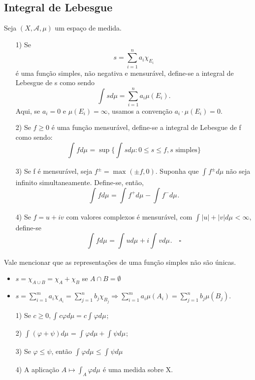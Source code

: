 \documentclass[MeasureTheory/measure_theory.tex]{subfiles}
\begin{document}
\subsection{Integral de Lebesgue}
\begin{def*}
	Seja \((X, \mathcal{A}, \mu )\) um espaço de medida.
	\begin{itemize}
		\item[1)] Se
		      \[
			      s=\sum\limits_{i=1}^{n}a_{i}\chi_{E_{i}}
		      \]
		      é uma função simples, não negativa e mensurável, define-se a integral de Lebesgue de s como sendo
		      \[
			      \int_{}^{}sd\mu = \sum\limits_{i=1}^{n}a_{i}\mu (E_{i}).
		      \]
		      Aqui, se \(a_{i} = 0\) e \(\mu (E_{i}) = \infty\), usamos a convenção \(a_{i}\cdot \mu (E_{i}) =0.\)
		\item[2)] Se \(f\geq 0\) é uma função mensurável, define-se a integral de Lebesgue de f como sendo:
		      \[
			      \int_{}f d\mu_{} = \sup_{}\biggl\{\int_{}^{}s d\mu : 0 \leq s\leq f, s \text{ simples}\biggr\}
		      \]
		\item[3)] Se f é mensurável, seja \(f^{\pm} = \max_{}(\pm f, 0)\). Suponha que \(\int_{}^{}f^{\pm}d\mu \) não seja infinito simultaneamente. Define-se, então,
		      \[
			      \int_{}f d\mu_{} = \int_{}f^{+} d\mu_{} - \int_{}f^{-} d\mu_{}.
		      \]
		\item[4)] Se \(f = u + iv\) com valores complexos é mensurável, com \(\int_{}|u|+|v| d\mu_{} < \infty\), define-se
		      \[
			      \int_{}f d\mu_{} = \int_{}u d\mu_{} + i\int_{}v d\mu_{}. \quad \square
		      \]
	\end{itemize}
\end{def*}
Vale mencionar que as representações de uma função simples não são únicas.
\begin{itemize}
	\item \(s = \chi_{A\cup B} = \chi_{A} + \chi_{B}\) se \(A\cap B = \emptyset \)
	\item \(s = \sum\limits_{i=1}^{m}a_{i}\chi_{A_{i}} = \sum\limits_{j=1}^{n}b_{j}\chi_{B_{j}} \Rightarrow \sum\limits_{i=1}^{m}a_{i}\mu (A_{i}) = \sum\limits_{j=1}^{n}b_{j}\mu (B_{j})\).
\end{itemize}
\begin{prop*}
	\begin{itemize}
		\item[1)] Se \(c\geq 0, \int_{}^{}c\varphi d\mu  = c\int_{}\varphi  d\mu_{}\);
		\item[2)] \(\int_{}(\varphi + \psi) d\mu_{} = \int_{}^{}\varphi d\mu + \int_{}\psi d\mu_{}\);
		\item[3)] Se \(\varphi \leq \psi\), então \(\int_{}\varphi  d\mu_{} \leq \int_{}\psi d\mu_{}\)
		\item[4)] A aplicação \(A\mapsto \int_{A}\varphi  d\mu_{}\) é uma medida sobre X.
	\end{itemize}
\end{prop*}
\end{document}
